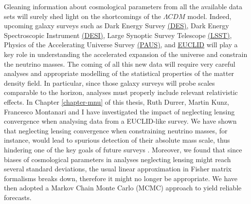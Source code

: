Gleaning information about cosmological parameters from all the available data sets will surely shed light on the shortcomings of the $\Lambda CDM$ model. Indeed, upcoming galaxy surveys such as Dark Energy Survey \href{www.darkenergysurvey.org}{(DES)}, Dark Energy Spectroscopic Instrument \href{http://desi.lbl.gov/}{(DESI)}, Large Synoptic Survey Telescope \href{www.lsst.org}{(LSST)}, Physics of the Accelerating Universe Survey \href{www.pausurvey.org}{(PAUS)}, and \href{www.euclid-ec.org}{EUCLID} will play a key role in understanding the accelerated expansion of the universe and constrain the neutrino masses. The coming of all this new data will require very careful analyses and appropriate modelling of the statistical properties of the matter density field. In particular, since those galaxy surveys will probe scales comparable to the horizon, analyses must properly include relevant relativistic effects. In Chapter \ref{chapter-mnu} of this thesis, Ruth Durrer, Martin Kunz, Francesco Montanari and I have investigated the impact of neglecting lensing convergence when analysing data from a EUCLID-like survey. We have shown that neglecting lensing convergence when constraining neutrino masses, for instance, would lead to spurious detection of their absolute mass scale, thus hindering one of the key goals of future surveys \cite{Cardona:2016qxn}. Moreover, we found that since biases of cosmological parameters in analyses neglecting lensing might reach several standard deviations, the usual linear approximation in Fisher matrix formalisms breaks down,  therefore it might no longer be appropriate. We have then adopted a Markov Chain Monte Carlo (MCMC) approach to yield reliable forecasts.

